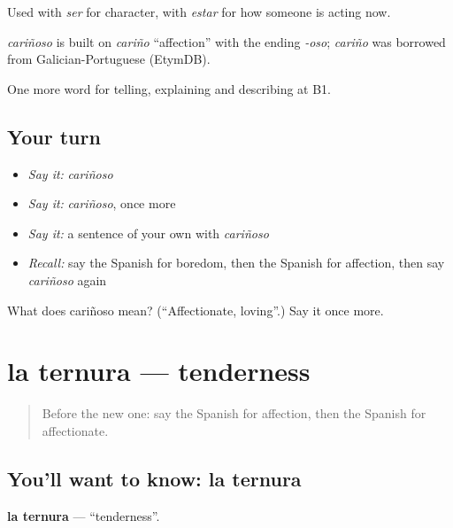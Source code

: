 Used with \emph{ser} for character, with \emph{estar} for how someone is acting now.

\begin{cousinweb}
\emph{cariñoso} is built on \emph{cariño} \textquotedblleft{}affection\textquotedblright{} with the ending \emph{-oso}; \emph{cariño} was borrowed from Galician-Portuguese (EtymDB).
\end{cousinweb}

\begin{grammarlens}[title={What you've built}]
One more word for telling, explaining and describing at B1.
\end{grammarlens}

\subsection*{Your turn}
\begin{itemize}
\raggedright
  \item \emph{Say it:} \emph{cariñoso}
  \item \emph{Say it:} \emph{cariñoso}, once more
  \item \emph{Say it:} a sentence of your own with \emph{cariñoso}
  \item \emph{Recall:} say the Spanish for boredom, then the Spanish for affection, then say \emph{cariñoso} again
\end{itemize}

\begin{tcolorbox}[breakable,colback=teal!4,colframe=teal!35!black,title={Before you move on}]
What does cariñoso mean? (\textquotedblleft{}Affectionate, loving\textquotedblright{}.) Say it once more.
\end{tcolorbox}
\section[la ternura]{la ternura — tenderness}

\label{lesson:ES-C714-ternura}



\begin{quote}
Before the new one: say the Spanish for affection, then the Spanish for affectionate.
\end{quote}

\subsection*{You'll want to know: la ternura}
\textbf{la ternura} — \textquotedblleft{}tenderness\textquotedblright{}.

